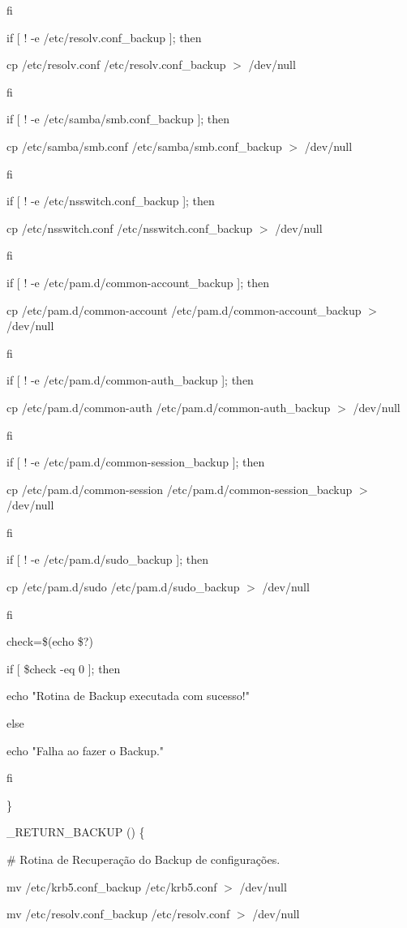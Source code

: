 	fi

	if [ ! -e /etc/resolv.conf\_backup ]; then

		cp /etc/resolv.conf /etc/resolv.conf\_backup $>$ /dev/null

	fi

	if [ ! -e /etc/samba/smb.conf\_backup ]; then

        	cp /etc/samba/smb.conf /etc/samba/smb.conf\_backup $>$ /dev/null

	fi

	if [ ! -e /etc/nsswitch.conf\_backup ]; then

        	cp /etc/nsswitch.conf /etc/nsswitch.conf\_backup $>$ /dev/null

	fi

	if [ ! -e /etc/pam.d/common-account\_backup ]; then

	        cp /etc/pam.d/common-account /etc/pam.d/common-account\_backup $>$ /dev/null

	fi

	if [ ! -e /etc/pam.d/common-auth\_backup ]; then

	        cp /etc/pam.d/common-auth /etc/pam.d/common-auth\_backup $>$ /dev/null

	fi

	if [ ! -e /etc/pam.d/common-session\_backup ]; then

	        cp /etc/pam.d/common-session /etc/pam.d/common-session\_backup $>$ /dev/null

	fi

	if [ ! -e /etc/pam.d/sudo\_backup ]; then

	        cp /etc/pam.d/sudo /etc/pam.d/sudo\_backup $>$ /dev/null

	fi
         
        check=\$(echo \$?)

   if [ \$check -eq 0 ]; then

      echo "Rotina de Backup executada com sucesso!"

   else

      echo "Falha ao fazer o Backup."

   fi
         
\}

\_RETURN\_BACKUP () \{

        \# Rotina de Recuperação do Backup de configurações.

        mv /etc/krb5.conf\_backup /etc/krb5.conf $>$ /dev/null

        mv /etc/resolv.conf\_backup /etc/resolv.conf $>$ /dev/null

